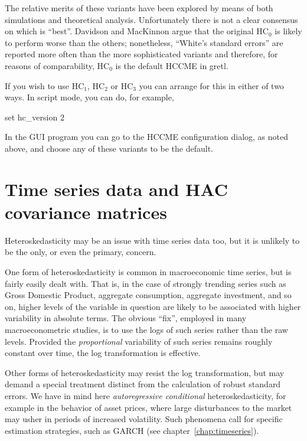 The relative merits of these variants have been explored by means of
both simulations and theoretical analysis.  Unfortunately there is not
a clear consensus on which is ``best''.  Davidson and MacKinnon argue
that the original HC$_0$ is likely to perform worse than the others;
nonetheless, ``White's standard errors'' are reported more often than
the more sophisticated variants and therefore, for reasons of
comparability, HC$_0$ is the default HCCME in gretl.

If you wish to use HC$_1$, HC$_2$ or HC$_3$ you can arrange for this
in either of two ways.  In script mode, you can do, for example,
%
\begin{code}
set hc_version 2
\end{code}
%
In the GUI program you can go to the HCCME configuration dialog, as
noted above, and choose any of these variants to be the default.


\section{Time series data and HAC covariance matrices}
\label{vcv-hac}

Heteroskedasticity may be an issue with time series data too, but it
is unlikely to be the only, or even the primary, concern.  

One form of heteroskedasticity is common in macroeconomic time series,
but is fairly easily dealt with.  That is, in the case of strongly
trending series such as Gross Domestic Product, aggregate consumption,
aggregate investment, and so on, higher levels of the variable in
question are likely to be associated with higher variability in
absolute terms.  The obvious ``fix'', employed in many
macroeconometric studies, is to use the logs of such series rather
than the raw levels.  Provided the \textit{proportional} variability
of such series remains roughly constant over time, the log
transformation is effective.  

Other forms of heteroskedasticity may resist the log transformation,
but may demand a special treatment distinct from the calculation of
robust standard errors.  We have in mind here \textit{autoregressive
  conditional} heteroskedasticity, for example in the behavior of
asset prices, where large disturbances to the market may usher in
periods of increased volatility.  Such phenomena call for specific
estimation strategies, such as GARCH (see
chapter~\ref{chap:timeseries}).


